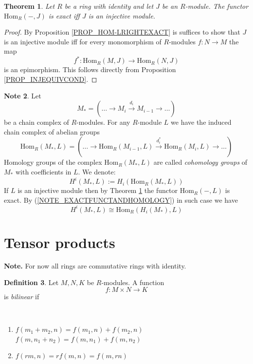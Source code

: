 \documentclass[12pt, letterpaper, oneside]{article}
\theoremstyle{plain}
\newtheorem{theorem}{Theorem}[section]
\theoremstyle{definition}
\newtheorem{definition}[theorem]{Definition}
\newtheorem{note}[theorem]{Note}
\newcommand{\lra}{\longrightarrow}
\newcommand{\Hom}{\mathrm{Hom}}
\newcommand{\benu}{\begin{enumerate}}
\newcommand{\eenu}{\end{enumerate}}
\newcommand{\vs}{\vskip 5mm}
\begin{document}
\vs\vs


\begin{theorem}
\label{THM_HOM-LINJEXACT}
Let $R$ be a ring with identity and let  $J$ be an $R$-module. The functor 
$\Hom_{R}(-, J )$ is exact iff $J$ is an injective module.   
\end{theorem}

\vs

\begin{proof}
By Proposition \ref{PROP_HOM-LRIGHTEXACT} is suffices to show that $J$ is an injective 
module iff for every monomorphism of $R$-modules $f\colon N \to M$ the map 
$$f^{\ast}\colon \Hom_{R}(M, J) \lra \Hom_{R}(N, J)$$
is an epimorphism. This follows directly from Proposition \ref{PROP_INJEQUIVCOND}.
\end{proof}




\vs\vs

\begin{note}
Let 
$$M_{\ast} = ({\dots} \lra  M_{i} \overset{d_{i}}{\lra} M_{i-1}  \lra {\dots})$$
be a chain complex of $R$-modules. For any $R$-module $L$ we have the induced chain 
complex of abelian groups
$$\Hom_{R}(M_{\ast}, L) = ({\dots} \lra \Hom_{R}(M_{i-1}, L) \overset{d^{\ast}_{i}}{\lra}  
\Hom_{R}(M_{i}, L) \lra {\dots})$$
Homology groups of the complex $\Hom_{R}(M_{\ast}, L)$ are called \emph{cohomology groups}
of $M_{\ast}$ with coefficients in $L$. We denote:
$$H^{i}(M_{\ast}, L) := H_{i}(\Hom_{R}(M_{\ast}, L))$$ 
If $L$ is an injective module then by Theorem \ref{THM_HOM-LINJEXACT} the functor
$\Hom_{R}(-, L)$ is exact. By (\ref{NOTE_EXACTFUNCTANDHOMOLOGY}) in such case we have 
$$H^{i}(M_{\ast}, L) \cong \Hom_{R}(H_{i}(M_{\ast}), L)$$
\end{note}









\newpage
\section{Tensor products}
\label{SEC_TENSORPROD}

\textbf{Note.} For now all rings are commutative rings with identity. 


\vs\vs

\begin{definition}
Let $M, N, K$ be $R$-modules. A function 
$$f\colon M\times N \lra K$$
is \emph{bilinear} if 

\vskip -13mm

\ 
\benu
\item $f(m_{1}+m_{2}, n) = f(m_{1}, n)+ f(m_{2}, n)$ \\
$f(m, n_{1}+ n_{2}) = f(m, n_{1})+ f(m, n_{2})$

\item $f(rm, n) = rf(m, n) = f(m, rn)$
\eenu

\end{definition} 
\end{document}
